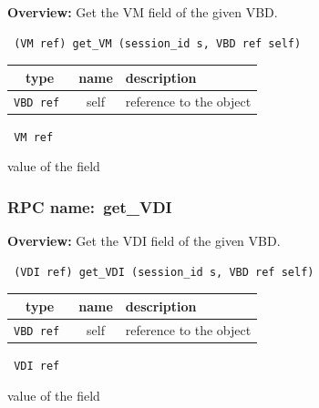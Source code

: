 {\bf Overview:} 
Get the VM field of the given VBD.

\begin{verbatim} (VM ref) get_VM (session_id s, VBD ref self)\end{verbatim}



 
\vspace{0.3cm}
\begin{tabular}{|c|c|p{7cm}|}
 \hline
{\bf type} & {\bf name} & {\bf description} \\ \hline
{\tt VBD ref } & self & reference to the object \\ \hline 

\end{tabular}

\vspace{0.3cm}

{\tt 
VM ref
}


value of the field
\vspace{0.3cm}
\vspace{0.3cm}
\vspace{0.3cm}
\subsubsection{RPC name:~get\_VDI}

{\bf Overview:} 
Get the VDI field of the given VBD.

\begin{verbatim} (VDI ref) get_VDI (session_id s, VBD ref self)\end{verbatim}



 
\vspace{0.3cm}
\begin{tabular}{|c|c|p{7cm}|}
 \hline
{\bf type} & {\bf name} & {\bf description} \\ \hline
{\tt VBD ref } & self & reference to the object \\ \hline 

\end{tabular}

\vspace{0.3cm}

{\tt 
VDI ref
}


value of the field
\vspace{0.3cm}
\vspace{0.3cm}
\vspace{0.3cm}
